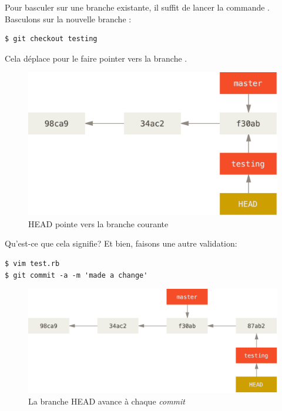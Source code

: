 Pour basculer sur une branche existante, il suffit de lancer la commande .
Basculons sur la nouvelle branche :
\begin{Schunk}
\begin{Verbatim}
$ git checkout testing
\end{Verbatim}
\end{Schunk}

Cela déplace  pour le faire pointer vers la branche .

\begin{figure}[!h]
  \centering
  \includegraphics{images/head-to-testing}
  \caption{HEAD pointe vers la branche courante}
  \label{fig:git:head-to-testing}
\end{figure}

Qu'est-ce que cela signifie?
Et bien, faisons une autre validation:
\begin{Schunk}
\begin{Verbatim}
$ vim test.rb
$ git commit -a -m 'made a change'
\end{Verbatim}
\end{Schunk}

\begin{figure}[!h]
  \centering
  \includegraphics{images/advance-testing}
  \caption{La branche HEAD avance à chaque \emph{commit}}
  \label{fig:git:advance-testing}
\end{figure}

